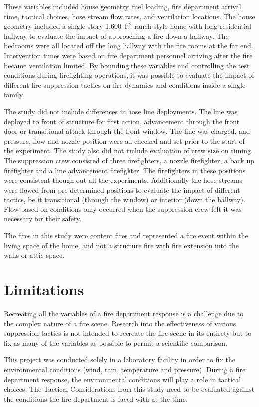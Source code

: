 \documentclass[12pt,oneside]{book}
\begin{document}
These variables included house geometry, fuel loading, fire department arrival time, tactical choices, hose stream flow rates, and ventilation locations. The house geometry included a single story 1,600~ft$^2$ ranch style home with long residential hallway to evaluate the impact of approaching a fire down a hallway. The bedrooms were all located off the long hallway with the fire rooms at the far end.  Intervention times were based on fire department personnel arriving after the fire became ventilation limited. By bounding these variables and controlling the test conditions during firefighting operations, it was possible to evaluate the impact of different fire suppression tactics on fire dynamics and conditions inside a single family.  

The study did not include differences in hose line deployments. The line was deployed to front of structure for first action, advancement through the front door or transitional attack through the front window. The line was charged, and pressure, flow and nozzle position were all checked and set prior to the start of the experiment. The study also did not include evaluation of crew size on timing. The suppression crew consisted of three firefighters, a nozzle firefighter, a back up firefighter and a line advancement firefighter. The firefighters in these positions were consistent though out all the experiments. Additionally the hose streams were flowed from pre-determined positions to evaluate the impact of different tactics, be it transitional (through the window) or interior (down the hallway). Flow based on conditions only occurred when the suppression crew felt it was necessary for their safety. 

The fires in this study were content fires and represented a fire event within the living space of the home, and not a structure fire with fire extension into the walls or attic space.

\section{Limitations}
Recreating all the variables of a fire department response is a challenge due to the complex nature of a fire scene. Research into the effectiveness of various suppression tactics is not intended to recreate the fire scene in its entirety but to fix as many of the variables as possible to permit a scientific comparison. 

This project was conducted solely in a laboratory facility in order to fix the environmental conditions (wind, rain, temperature and pressure). During a fire department response, the environmental conditions will play a role in tactical choices. The Tactical Considerations from this study need to be evaluated against the conditions the fire department is faced with at the time. 
\end{document}
